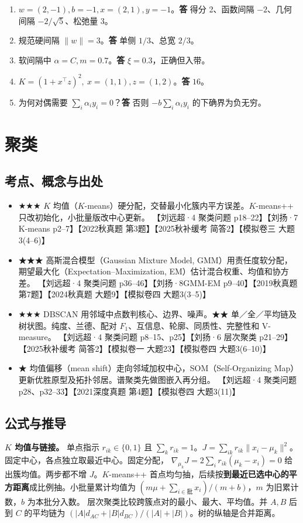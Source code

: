\documentclass[UTF8,a4paper,zihao=-4,fontset=fandol]{ctexart}
\begin{document}
\begin{enumerate}[nosep]
\item \(w=(2,-1),b=-1,x=(2,1),y=-1\)。\textbf{答} 得分 2、函数间隔 \(-2\)、几何间隔 \(-2/\sqrt5\)、松弛量 3。
\item 规范硬间隔 \(\|w\|=3\)。\textbf{答} 单侧 \(1/3\)、总宽 \(2/3\)。
\item 软间隔中 \(\alpha=C,m=0.7\)。\textbf{答} \(\xi=0.3\)，正确但入带。
\item \(K=(1+x^\top z)^2,\ x=(1,1),z=(1,2)\)。\textbf{答} \(16\)。
\item 为何对偶需要 \(\sum_i\alpha_i y_i=0\)？\textbf{答} 否则 \(-b\sum_i\alpha_i y_i\) 的下确界为负无穷。
\end{enumerate}

\section{聚类}

\subsection{考点、概念与出处}
\begin{itemize}
\item ★★★ $K$ 均值（$K$-means）硬分配，交替最小化簇内平方误差。$K$-means++ 只改初始化，小批量版改中心更新。 【刘远超·4 聚类问题 p18–22】【刘扬·7 K-means p2–7】【2022秋真题 第3题】【2025秋补缓考 简答2】【模拟卷三 大题3(4–6)】
\item ★★★ 高斯混合模型（Gaussian Mixture Model, GMM）用责任度软分配，期望最大化（Expectation–Maximization, EM）估计混合权重、均值和协方差。 【刘远超·4 聚类问题 p36–46】【刘扬·8GMM-EM p9–40】【2019秋真题 第7题】【2024秋真题 大题9】【模拟卷四 大题3(3–5)】
\item ★★★ DBSCAN 用邻域中点数判核心、边界、噪声。★★ 单／全／平均链及树状图。纯度、兰德、配对 $F_1$、互信息、轮廓、同质性、完整性和 V-measure。 【刘远超·4 聚类问题 p8–15、p25】【刘扬·6 层次聚类 p21–29】【2025秋补缓考 简答2】【模拟卷一 大题23】【模拟卷四 大题3(6–10)】
\item ★ 均值偏移（mean shift）走向邻域加权中心，SOM（Self-Organizing Map）更新优胜原型及拓扑邻居。谱聚类先做图嵌入再分组。 【刘远超·4 聚类问题 p28、p32–33】【2021深度真题 第4题】【模拟卷四 大题3(11)】
\end{itemize}

\subsection{公式与推导}
\textbf{$K$ 均值与链接。} 单点指示 $r_{ik}\in\{0,1\}$ 且 $\sum_k r_{ik}=1$。$J=\sum_{ik}r_{ik}\|x_i-\mu_k\|^2$。固定中心，各点独立取最近中心。固定分配，
$\nabla_{\mu_k}J=2\sum_i r_{ik}(\mu_k-x_i)=0$ 给出簇均值。两步都不增 $J$。$K$-means++ 首点均匀抽，后续按\textbf{到最近已选中心的平方距离}成比例抽。小批量累计均值为 $(m\mu+\sum_{i\in\text{批}}x_i)/(m+b)$，$m$ 为旧累计数，$b$ 为本批分入数。
层次聚类比较跨簇点对的最小、最大、平均值。并 $A,B$ 后到 $C$ 的平均链为 $(|A|d_{AC}+|B|d_{BC})/(|A|+|B|)$。树的纵轴是合并距离。
\end{document}
